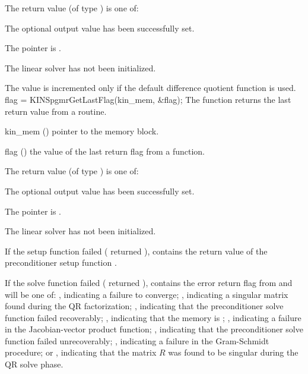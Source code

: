 {
  The return value  (of type ) is one of:
  \begin{args}
  \item[\Id{KINSPGMR\_SUCCESS}] 
    The optional output value has been successfully set.
  \item[\Id{KINSPGMR\_MEM\_NULL}]
    The  pointer is .
  \item[\Id{KINSPGMR\_LMEM\_NULL}]
    The {\kinspgmr} linear solver has not been initialized.
  \end{args}
}
{
  The value  is incremented only if the default 
   difference quotient function is used.
}
{
  flag = KINSpgmrGetLastFlag(kin\_mem, \&flag);
}
{
  The function  returns the
  last return value from a {\kinspgmr} routine. 
}
{
  \begin{args}
  \item[kin\_mem] ()
    pointer to the {\kinsol} memory block.
  \item[flag] ()
    the value of the last return flag from a {\kinspgmr} function.
  \end{args}
}
{
  The return value  (of type ) is one of:
  \begin{args}
  \item[\Id{KINSPGMR\_SUCCESS}] 
    The optional output value has been successfully set.
  \item[\Id{KINSPGMR\_MEM\_NULL}]
    The  pointer is .
  \item[\Id{KINSPGMR\_LMEM\_NULL}]
    The {\kinspgmr} linear solver has not been initialized.
  \end{args}
}
{
  If the {\kinspgmr} setup function failed ( returned
  ),  contains the return value of the
  preconditioner setup function .

  If the {\kinspgmr} solve function failed ( returned
  ),  contains the error return flag from
   and will be one of:
 , indicating a failure to converge;
 , indicating a singular matrix found during the QR
  factorization;
 , indicating that the preconditioner solve function
  failed recoverably;
  , indicating that the {\spgmr} memory is ;
  , indicating a failure in the Jacobian-vector product
  function;
  , indicating that the preconditioner solve
  function  failed unrecoverably;
  , indicating a failure in the Gram-Schmidt procedure; 
  or , indicating that the matrix $R$ was found to be
  singular during the QR solve phase.
}

